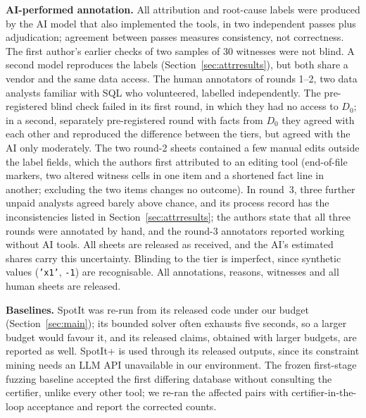 \textbf{AI-performed annotation.} All attribution and root-cause labels were produced by the AI model that also implemented the tools, in two independent passes plus adjudication; agreement between passes measures consistency, not correctness. The first author's earlier checks of two samples of 30 witnesses were not blind. A second model reproduces the labels (Section~\ref{sec:attrresults}), but both share a vendor and the same data access. The human annotators of rounds 1--2, two data analysts familiar with SQL who volunteered, labelled independently. The pre-registered blind check failed in its first round, in which they had no access to $D_0$; in a second, separately pre-registered round with facts from $D_0$ they agreed with each other and reproduced the difference between the tiers, but agreed with the AI only moderately. The two round-2 sheets contained a few manual edits outside the label fields, which the authors first attributed to an editing tool (end-of-file markers, two altered witness cells in one item and a shortened fact line in another; excluding the two items changes no outcome). In round~3, three further unpaid analysts agreed barely above chance, and its process record has the inconsistencies listed in Section~\ref{sec:attrresults}; the authors state that all three rounds were annotated by hand, and the round-3 annotators reported working without AI tools. All sheets are released as received, and the AI's estimated shares carry this uncertainty. Blinding to the tier is imperfect, since synthetic values (\texttt{'x1'}, \texttt{-1}) are recognisable. All annotations, reasons, witnesses and all human sheets are released.

\textbf{Baselines.} SpotIt was re-run from its released code under our budget (Section~\ref{sec:main}); its bounded solver often exhausts five seconds, so a larger budget would favour it, and its released claims, obtained with larger budgets, are reported as well. SpotIt+ is used through its released outputs, since its constraint mining needs an LLM API unavailable in our environment. The frozen first-stage fuzzing baseline accepted the first differing database without consulting the certifier, unlike every other tool; we re-ran the affected pairs with certifier-in-the-loop acceptance and report the corrected counts.

